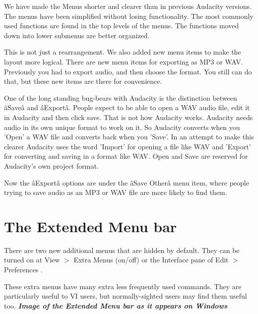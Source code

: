 We have made the Menus shorter and clearer than in previous Audacity versions. The menus have been simplified without losing functionality. The most commonly used functions are found in the top levels of the menus. The functions moved down into lower submenus are better organized.

This is not just a rearrangement.  We also added new menu items to make the layout more logical.  There are new menu items for exporting as MP3 or WAV. Previously you had to export audio, and then choose the format. You still can do that, but these new items are there for convenience.

One of the long standing bug-bears with Audacity is the distinction between \^aSave\^a and \^aExport\^a. People expect to be able to open a WAV audio file, edit it in Audacity and then click save. That is not how Audacity works. Audacity needs audio in its own unique format to work on it. So Audacity converts when you 'Open' a WAV file and converts back when you 'Save'. In an attempt to make this clearer Audacity uses the word 'Import' for opening a file like WAV and 'Export' for converting and saving in a format like WAV. Open and Save are reserved for Audacity's own project format.

Now the \^aExport\^a options are under the \^aSave Other\^a menu item, where people trying to save audio as an MP3 or WAV file are more likely to find them. 





\section{
The Extended Menu bar
}


There are two new additional menus that are hidden by default.  They can be turned on at 
View \mbox{$>$} Extra Menus (on/off)
 or the Interface pane of 
Edit \mbox{$>$} Preferences
.

These extra menus have many extra less frequently used commands.  They are particularly useful to VI users, but normally-sighted users may find them useful too.
\textit{\textbf{Image of the Extended Menu bar as it appears on Windows}}

